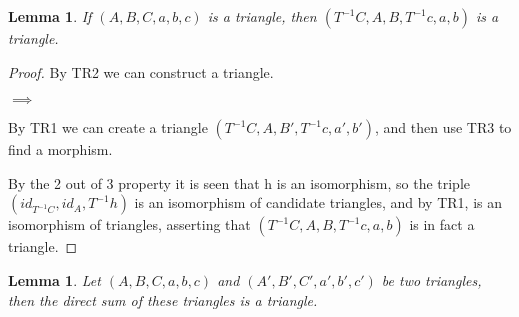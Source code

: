 \documentclass[12pt]{article}
\newtheorem{lemma}[theorem]{Lemma}
\theoremstyle{definition}
\theoremstyle{remark}
\begin{document}
            \begin{lemma}
                If $(A,B,C,a,b,c)$ is a triangle, then $(T^{-1}C,A,B,T^{-1}c,a,b)$ is a triangle.
            \end{lemma}

            \begin{proof}
                By TR2 we can construct a triangle.
                \begin{center}
                    $\implies$
                \end{center}
                By TR1 we can create a triangle $(T^{-1}C,A,B',T^{-1}c,a',b')$, and then use TR3 to find a morphism.
                \begin{center}
                \end{center}
                By the 2 out of 3 property it is seen that h is an isomorphism, so the triple $(id_{T^{-1}C}, id_A, T^{-1}h)$ is an isomorphism of candidate triangles, and by TR1, is an isomorphism of triangles, asserting that $(T^{-1}C,A,B,T^{-1}c,a,b)$ is in fact a triangle.
            \end{proof}

            \begin{lemma}
                Let $(A,B,C,a,b,c)$ and $(A',B',C',a',b',c')$ be two triangles, then the direct sum of these triangles is a triangle.
            \end{lemma}
\end{document}
